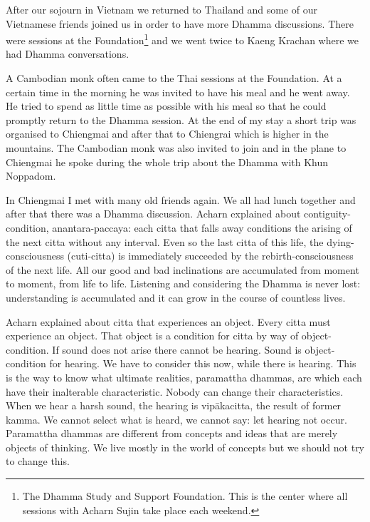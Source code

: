 {{{{{{{After
our sojourn in Vietnam we returned to
Thailand and some of our Vietnamese friends joined us in order to have
more Dhamma discussions. There were sessions at the
Foundation\footnote{The Dhamma Study and Support
Foundation. This is the center where all sessions with Acharn Sujin take
place each weekend.}
and we went twice to Kaeng Krachan where we had Dhamma conversations. 

A Cambodian monk often came to the Thai
sessions at the Foundation. At a certain time in the morning he was
invited to have his meal and he went away. He tried to spend as little
time as possible with his meal so that he could promptly return to the
Dhamma session. At the end of my stay a short trip was organised to
Chiengmai and after that to Chiengrai which is higher in the mountains.
The Cambodian monk was also invited to join and in the plane to
Chiengmai he spoke during the whole trip about the Dhamma with Khun
Noppadom.

In Chiengmai I met with many old
friends again. We all had lunch together and after that there was a
Dhamma discussion. Acharn explained about contiguity-condition,
anantara-paccaya: each citta that falls away conditions the arising of
the next citta without any interval. Even so the last citta of this
life, the dying-consciousness (cuti-citta) is immediately succeeded by
the rebirth-consciousness of the next life. All our good and bad
inclinations are accumulated from moment to moment, from life to life.
Listening and considering the Dhamma is never lost: understanding is
accumulated and it can grow in the course of countless lives. 

Acharn explained about citta that
experiences an object. Every citta must experience an object. That
object is a condition for citta by way of object-condition. If sound
does not arise there cannot be hearing. Sound is object-condition for
hearing. We have to consider this now, while there is hearing. This is
the way to know what ultimate realities, paramattha dhammas, are which
each have their inalterable characteristic. Nobody can change their
characteristics. When we hear a harsh sound, the hearing is vipākacitta,
the result of former kamma. We cannot select what is heard, we cannot
say: let hearing not occur. Paramattha dhammas are different from
concepts and ideas that are merely objects of thinking. We live mostly
in the world of concepts but we should not try to change this. 

}}}}}}}
